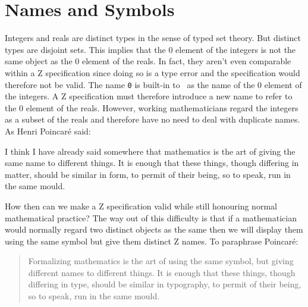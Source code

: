 \documentclass{amsart}
\begin{document}
\section{Names and Symbols}

Integers and reals are distinct types in the sense of typed set theory.
But distinct types are disjoint sets.
This implies that the $0$ element of the integers is not the same object as the $0$ element of the reals.
In fact, they aren't even comparable within a Z specification since doing so is a type error and the 
specification would therefore not be valid.
The name \texttt{0} is built-in to \ZN\  as the name of the $0$ element of the integers.
A Z specification must therefore introduce a new name to refer to the $0$ element of the reals.
However, working mathematicians regard the integers as a subset of the reals and therefore have no need to deal with duplicate names.
As Henri Poincar\'{e} \cite{poincare-fm} said:
\begin{displayquote}
I think I have already said somewhere that mathematics is the art of giving the same name to different things. 
It is enough that these things, though differing in matter, should be similar in form, to permit of their being, so to speak, run in the same mould.\end{displayquote}

How then can we make a Z specification valid while still honouring normal mathematical practice?
The way out of this difficulty is that if a mathematician would normally regard two distinct objects as the same
then we will display them using the same symbol but give them distinct Z  names.
To paraphrase Poincar\'{e}:
\begin{quote}
Formalizing mathematics is the art of using the same symbol, but giving different names to different things. 
It is enough that these things, though differing in type, should be similar in typography, 
to permit of their being, so to speak, run in the same mould.
\end{quote}
\end{document}
